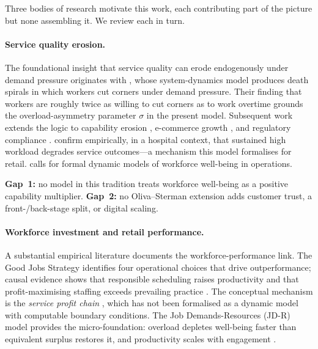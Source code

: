 \documentclass[msom,dblanonrev]{informs4}
\begin{document}
Three bodies of research motivate this work, each contributing part of the picture but none assembling it. We review each in turn.

\paragraph{Service quality erosion.}\label{sec:lit:erosion}
The foundational insight that service quality can erode endogenously under demand pressure originates with \citet{oliva2001cutting}, whose system-dynamics model \citep{sterman2000business} produces death spirals in which workers cut corners under demand pressure. Their finding that workers are roughly twice as willing to cut corners as to work overtime grounds the overload-asymmetry parameter $\sigma$ in the present model. Subsequent work extends the logic to capability erosion \citep{rahmandad2016capability, repenning2001nobody}, e-commerce growth \citep{oliva2003limits}, and regulatory compliance \citep{martinez2014drift}. \citet{kc2009impact} confirm empirically, in a hospital context, that sustained high workload degrades service outcomes---a mechanism this model formalises for retail. \citet{corbett2024wellbeing} calls for formal dynamic models of workforce well-being in operations.

\textbf{Gap~1:} no model in this tradition treats workforce well-being as a positive capability multiplier. \textbf{Gap~2:} no Oliva--Sterman extension adds customer trust, a front-/back-stage split, or digital scaling.

\paragraph{Workforce investment and retail performance.}\label{sec:lit:workforce}
A substantial empirical literature documents the workforce-performance link. The Good Jobs Strategy \citep{ton2014good} identifies four operational choices that drive outperformance; causal evidence shows that responsible scheduling raises productivity \citep{kesavan2022doing} and that profit-maximising staffing exceeds prevailing practice \citep{fisher2021staffing, dube2020minimum}. The conceptual mechanism is the \emph{service profit chain} \citep{heskett1994putting}, which has not been formalised as a dynamic model with computable boundary conditions. The Job Demands-Resources (JD-R) model \citep{bakker2007job, demerouti2001job} provides the micro-foundation: overload depletes well-being faster than equivalent surplus restores it, and productivity scales with engagement \citep{mas2009peers}.
\end{document}
